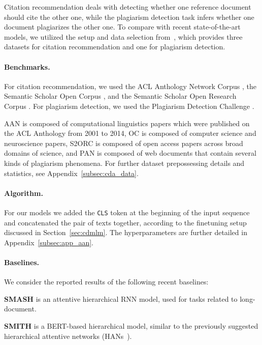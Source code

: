 \documentclass[11pt,a4paper]{article}
\begin{document}
Citation recommendation deals with detecting whether one reference document should cite the other one, while the plagiarism detection task infers whether one document plagiarizes the other one. To compare with recent state-of-the-art models, we utilized the setup and data selection from~\citet{zhou-etal-2020-multilevel}, which provides three datasets for citation recommendation and one for plagiarism detection. 

\paragraph{Benchmarks.} For citation recommendation, we used the ACL Anthology Network Corpus \citep[AAN;][]{radev2013acl}, the Semantic Scholar Open Corpus \citep[OC;][]{bhagavatula-etal-2018-content}, and the Semantic Scholar Open Research Corpus \citep[S2ORC;][]{lo-etal-2020-s2orc}. For plagiarism detection, we used the Plagiarism Detection Challenge \citep[PAN;][]{potthast2013overview}. 

AAN is composed of computational linguistics papers which were published on the ACL Anthology from 2001 to 2014, OC is composed of computer science and neuroscience papers, S2ORC is composed of open access papers across broad domains of science, and PAN is composed of web documents that contain several kinds of plagiarism phenomena. For further dataset prepossessing details and statistics, see Appendix~\ref{subsec:cda_data}.

\paragraph{Algorithm.} For our models we added the {\tt CLS} token at the beginning of the input sequence and concatenated the pair of texts together, according to the finetuning setup discussed in Section~\ref{sec:cdmlm}. The hyperparameters are further detailed in Appendix~\ref{subsec:app_aan}.

\paragraph{Baselines.} We consider the reported results of the following recent baselines:

{\bf \textsc{SMASH}} \cite{jiang2019semantic} is an attentive hierarchical RNN model, used for tasks related to long-document.  

{\bf \textsc{SMITH}} \cite{Yang-Siamese-2020} is a BERT-based hierarchical model, similar to the previously suggested hierarchical attentive networks (HANs~\cite{yang-etal-2016-hierarchical}).  
\end{document}

